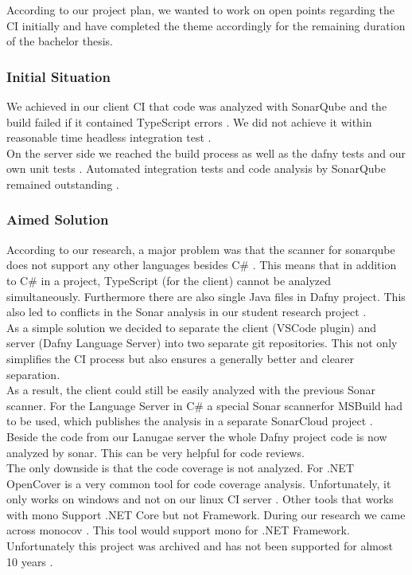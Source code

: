 According to our project plan, we wanted to work on open points regarding the CI initially and have completed the theme accordingly for the remaining duration of the bachelor thesis.

\subsubsection{Initial Situation}
We achieved in our client CI that code was analyzed with SonarQube and the build failed if it contained TypeScript errors \cite{sa}.
We did not achieve it within reasonable time headless integration test \cite{sa}. \\

On the server side we reached the build process as well as the dafny tests and our own unit tests \cite{sa}.
Automated integration tests and code analysis by SonarQube remained outstanding \cite{sa}.

\subsubsection{Aimed Solution}
According to our research, a major problem was that the scanner for sonarqube does not support any other languages besides C\# \cite{sonar-supports-only-one-language}.
This means that in addition to C\# in a project, TypeScript (for the client) cannot be analyzed simultaneously.
Furthermore there are also single Java files in Dafny project.
This also led to conflicts in the Sonar analysis in our student research project \cite{sa}. \\

As a simple solution we decided to separate the client (VSCode plugin) and server (Dafny Language Server) into two separate git repositories.
This not only simplifies the CI process but also ensures a generally better and clearer separation. \\

As a result, the client could still be easily analyzed with the previous Sonar scanner.
For the Language Server in C\# a special Sonar scannerfor MSBuild had to be used, which publishes the analysis in a separate SonarCloud project \cite{dev}.
Beside the code from our Lanugae server the whole Dafny project code is now analyzed by sonar.
This can be very helpful for code reviews. \\

The only downside is that the code coverage is not analyzed.
For .NET OpenCover is a very common tool for code coverage analysis.
Unfortunately, it only works on windows and not on our linux CI server \cite{opencover}.
Other tools that works with mono Support .NET Core but not Framework.
During our research we came across monocov \cite{monocov}. This tool would support mono for .NET Framework. Unfortunately this project was archived and has not been supported for almost 10 years \cite{monocov}.


